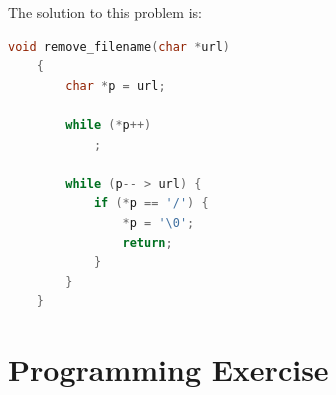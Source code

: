 \documentclass[12pt]{article}
\begin{document}
\begin{enumerate}[1.]
    \bigskip

    The solution to this problem is:

    \bigskip

\begin{lstlisting}[language=c]
    void remove_filename(char *url)
    {
        char *p = url;

        while (*p++)
            ;

        while (p-- > url) {
            if (*p == '/') {
                *p = '\0';
                return;
            }
        }
    }
\end{lstlisting}


\end{enumerate}

\bigskip

\section{Programming Exercise}
\end{document}

